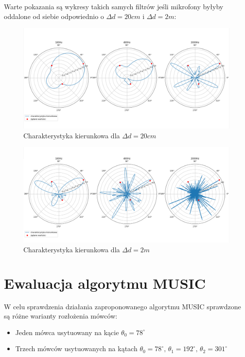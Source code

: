 \noindent Warte pokazania są wykresy takich samych filtrów jeśli mikrofony byłyby oddalone od siebie odpowiednio o $\Delta d = 20cm$ i $\Delta d = 2m$:

\begin{figure}[h!]
    \centering
    \includegraphics[width=\textwidth]{Images/directivity0.2m.png}
    \caption{Charakterystyka kierunkowa dla $\Delta d = 20cm$}
    \label{fig:directivity0.2}
\end{figure}

\begin{figure}[h!]
    \centering
    \includegraphics[width=\textwidth]{Images/directivity2m.png}
    \caption{Charakterystyka kierunkowa dla $\Delta d = 2m$}
    \label{fig:directivity2}
\end{figure}

\newpage

\section{Ewaluacja algorytmu MUSIC}

\noindent W celu sprawdzenia działania zaproponowanego algorytmu MUSIC sprawdzone są różne warianty rozłożenia mówców:

\begin{itemize}
    \item Jeden mówca usytuowany na kącie $\theta_{0} = 78^{\circ}$

    \item Trzech mówców usytuowanych na kątach $\theta_{0} = 78^{\circ}, \, \theta_{1} = 192^{\circ}, \, \theta_{2} = 301^{\circ}$
    
\end{itemize}

